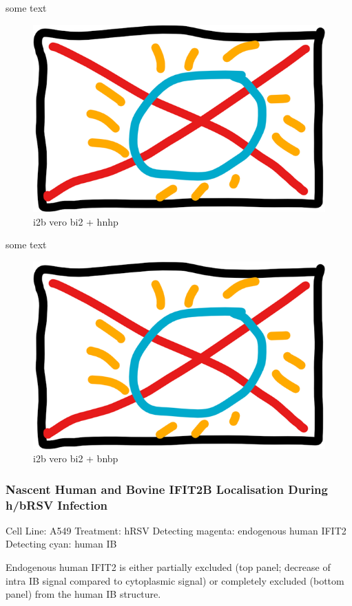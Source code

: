 some text

\begin{figure}
    \centering
    \includegraphics[width=0.5\linewidth]{09. Chapter 4//Figs//02. I2B/00. placeholder.png}
    \caption[i2b vero bi2 + hnhp]{i2b vero bi2 + hnhp}
    \label{i2b vero bi2 + hnhp}
\end{figure}

some text

\begin{figure}
    \centering
    \includegraphics[width=0.5\linewidth]{09. Chapter 4//Figs//02. I2B/00. placeholder.png}
    \caption[i2b vero bi2 + bnbp]{i2b vero bi2 + bnbp}
    \label{i2b vero bi2 + bnbp}
\end{figure}

\subsubsection{Nascent Human and Bovine IFIT2B Localisation During h/bRSV Infection} \label{Nascent Human and Bovine IFIT2A Localisation During h/bRSV Infection}
Cell Line: A549 \newline
Treatment: hRSV \newline
Detecting magenta: endogenous human IFIT2  \newline
Detecting cyan: human IB \newline

Endogenous human IFIT2 is either partially excluded (top panel; decrease of intra IB signal compared to cytoplasmic signal) or completely excluded (bottom panel) from the human IB structure.

